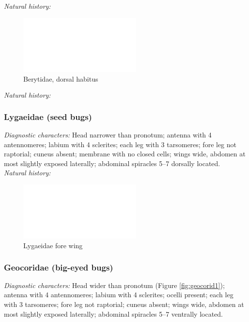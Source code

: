\documentclass[letterpaper, 11pt]{article}
\begin{document}
\noindent{}\textit{Natural history:} \\

\begin{figure}[ht!]
 \centering
 \includegraphics[width=0.55\textwidth]{image14}
 \caption{Berytidae, dorsal habitus}
 \label{fig:berytid1}
\end{figure}

\noindent{}\textit{Natural history:} \\

\subsubsection{Lygaeidae (seed bugs)}
\noindent{}\textit{Diagnostic characters:} Head narrower than pronotum; antenna with 4 antennomeres; labium with 4 sclerites; each leg with 3 tarsomeres; fore leg not raptorial; cuneus absent; membrane with no closed cells; wings wide, abdomen at most slightly exposed laterally; abdominal spiracles 5--7 dorsally located.\\

\noindent{}\textit{Natural history:} \\

\begin{figure}[ht!]
 \centering
 \includegraphics[width=0.55\textwidth]{image14}
 \caption{Lygaeidae fore wing}
 \label{fig:lygaeid1}
\end{figure}

\subsubsection{Geocoridae (big-eyed bugs)}
\noindent{}\textit{Diagnostic characters:} Head wider than pronotum (Figure \ref{fig:geocorid1}); antenna with 4 antennomeres; labium with 4 sclerites; ocelli present; each leg with 3 tarsomeres; fore leg not raptorial; cuneus absent; wings wide, abdomen at most slightly exposed laterally; abdominal spiracles 5--7 ventrally located.\\
\end{document}

